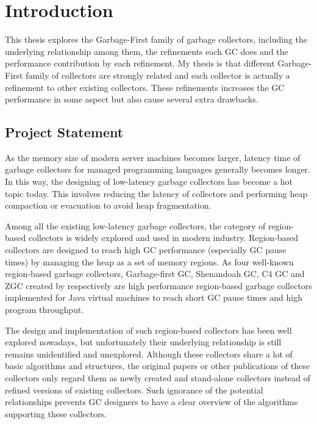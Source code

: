 \chapter{Introduction}
\label{cha:intro}

This thesis explores the Garbage-First family of garbage collectors, including
the underlying relationship among them, the refinements each GC does and the performance
contribution by each refinement.
My thesis is that different Garbage-First family of collectors are strongly related
and each collector is actually a refinement to other existing collectors.
These refinements increases the GC performance in some aspect but also cause several extra drawbacks.

\section{Project Statement}

As the memory size of modern server machines becomes larger, latency time of
garbage collectors for managed programming languages generally becomes longer.
In this way, the designing of low-latency garbage collectors has become
a hot topic today. This involves reducing the latency of collectors and
performing heap compaction or evacuation to avoid heap fragmentation.

Among all the existing low-latency garbage collectors, the category of region-based
collectors is widely explored and used in modern industry.
Region-based collectors are designed to reach high GC
performance (especially GC pause times) by managing the heap as a set of memory regions.
As four well-known region-based garbage collectors,
Garbage-first GC, Shenandoah GC, C4 GC and ZGC created by
\citep{detlefs2004garbage,flood2016shenandoah,tene2011c4,liden_karlsson_2018} respectively
are high performance region-based garbage collectors implemented for Java virtual machines
to reach short GC pause times and high program throughput.

The design and implementation of such region-based collectors has been well
explored nowadays, but unfortunately their underlying relationship is still remains unidentified and unexplored.
Although these collectors share a lot of basic algorithms and structures,
the original papers or other publications of these collectors only regard them as
newly created and stand-alone collectors instead of refined versions of existing collectors.
Such ignorance of the potential relationships prevents GC designers to have a clear
overview of the algorithms supporting these collectors.

